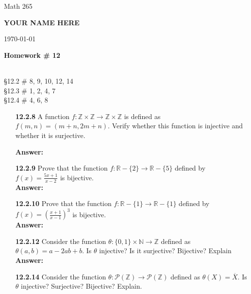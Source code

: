 \documentclass[11pt]{report}
\theoremstyle{plain}
\newcommand{\Z}{\mathbb{Z}}
\newcommand{\R}{\mathbb{R}}
\newcommand{\N}{\mathbb{N}}
\begin{document}
\hfill Math 265

\hfill \textbf{YOUR NAME HERE}

\hfill \today

\begin{center}
\Large{\textbf{Homework \# 12}} \\

\end{center}

\noindent{} \\ \S 12.2 \# 8, 9, 10, 12, 14\\
\S 12.3 \# 1, 2, 4, 7\\
\S 12.4 \# 4, 6, 8\\

\begin{enumerate}
\item[\textbf{12.2.8}] A function $f:\Z \times \Z \to \Z \times \Z$ is defined as $f(m,n)=(m+n,2m+n).$ Verify whether this function is injective and whether it is surjective.

\textbf{Answer:} \\

\item[\textbf{12.2.9}] Prove that the function $f: \R -\{2\} \to \R-\{5\}$ defined by $f(x) =\frac{5x+1}{x-2}$ is bijective.\\

\textbf{Answer:} \\

\item[\textbf{12.2.10}] Prove that the function $f:\R -\{1\} \to \R -\{1\}$ defined by $f(x)=\left( \frac{x+1}{x-1} \right)^3$ is bijective.\\

\textbf{Answer:} \\

\item[\textbf{12.2.12}] Consider the function $\theta: \{0,1\} \times \N \to \Z$ defined as $\theta(a,b) = a-2ab+b.$ Is $\theta$ injective?
Is it surjective? Bijective? Explain\\

\textbf{Answer:} \\

\item[\textbf{12.2.14}] Consider the function $\theta: \mathcal{P}(\Z) \to \mathcal{P}(\Z)$ defined as $\theta(X)=\overline{X}.$ Is $\theta$ injective? Surjective? Bijective? Explain.\\


\end{enumerate}
\end{document}
